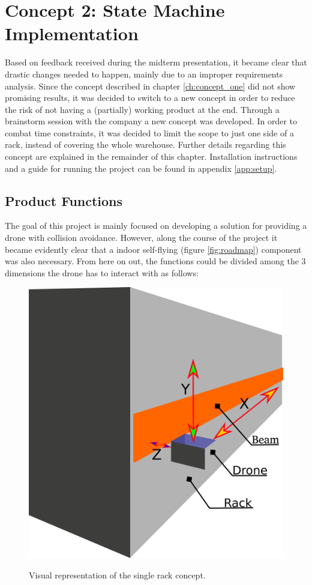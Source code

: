 \chapter{Concept 2: State Machine Implementation}
\label{ch:concept_two}
Based on feedback received during the midterm presentation, it became clear that drastic changes needed to happen, mainly due to an improper requirements analysis. Since the concept described in chapter \ref{ch:concept_one} did not show promising results, it was decided to switch to a new concept in order to reduce the risk of not having a (partially) working product at the end. Through a brainstorm session with the company a new concept was developed. In order to combat time constraints, it was decided to limit the scope to just one side of a rack, instead of covering the whole warehouse. Further details regarding this concept are explained in the remainder of this chapter. Installation instructions and a guide for running the project can be found in appendix \ref{app:setup}.

\section{Product Functions}
\label{sec:product_description}
The goal of this project is mainly focused on developing a solution for providing a drone with collision avoidance. However, along the course of the project it became evidently clear that a indoor self-flying (figure \ref{fig:roadmap}) component was also necessary. From here on out, the functions could be divided among the 3 dimensions the drone has to interact with as follows:
\begin{figure}[h]
	\centering
	\includegraphics[width=\linewidth/2]{img/drone_concept_diagram}
	\label{fig:drone_concept}
	\caption{Visual representation of the single rack concept.}
\end{figure}

